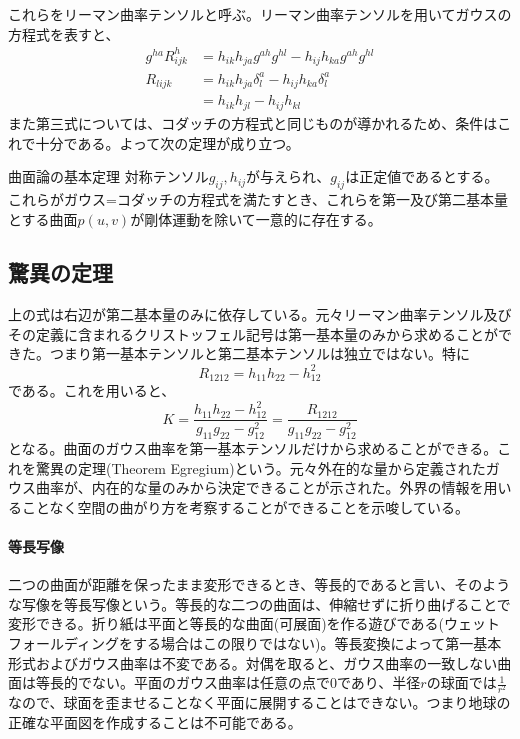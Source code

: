         これらをリーマン曲率テンソルと呼ぶ。リーマン曲率テンソルを用いてガウスの方程式を表すと、
        \begin{align*}
            g^{ha}R^h_{ijk} &= h_{ik}h_{ja}g^{ah}g^{hl} - h_{ij}h_{ka}g^{ah}g^{hl}\\
            R_{lijk} &= h_{ik}h_{ja}\delta_l^a - h_{ij}h_{ka}\delta_l^a\\
            &= h_{ik}h_{jl} - h_{ij}h_{kl}
        \end{align*}
        また第三式については、コダッチの方程式と同じものが導かれるため、条件はこれで十分である。よって次の定理が成り立つ。
        \begin{thm}{曲面論の基本定理}
            対称テンソル$g_{ij}, h_{ij}$が与えられ、$g_{ij}$は正定値であるとする。これらがガウス=コダッチの方程式を満たすとき、これらを第一及び第二基本量とする曲面$p(u,v)$が剛体運動を除いて一意的に存在する。
        \end{thm}

    \subsection{驚異の定理}
        上の式は右辺が第二基本量のみに依存している。元々リーマン曲率テンソル及びその定義に含まれるクリストッフェル記号は第一基本量のみから求めることができた。つまり第一基本テンソルと第二基本テンソルは独立ではない。特に
            \[R_{1212} = h_{11}h_{22} - h_{12}^2\]
        である。これを用いると、
            \[K = \frac{h_{11}h_{22} - h_{12}^2}{g_{11}g_{22} - g_{12}^2} = \frac{R_{1212}}{g_{11}g_{22}-g_{12}^2}\]
        となる。曲面のガウス曲率を第一基本テンソルだけから求めることができる。これを驚異の定理(Theorem Egregium)という。元々外在的な量から定義されたガウス曲率が、内在的な量のみから決定できることが示された。外界の情報を用いることなく空間の曲がり方を考察することができることを示唆している。


    \paragraph{等長写像}
        二つの曲面が距離を保ったまま変形できるとき、等長的であると言い、そのような写像を等長写像という。等長的な二つの曲面は、伸縮せずに折り曲げることで変形できる。折り紙は平面と等長的な曲面(可展面)を作る遊びである(ウェットフォールディングをする場合はこの限りではない)。等長変換によって第一基本形式およびガウス曲率は不変である。対偶を取ると、ガウス曲率の一致しない曲面は等長的でない。平面のガウス曲率は任意の点で0であり、半径$r$の球面では$\frac{1}{r^2}$なので、球面を歪ませることなく平面に展開することはできない。つまり地球の正確な平面図を作成することは不可能である。
